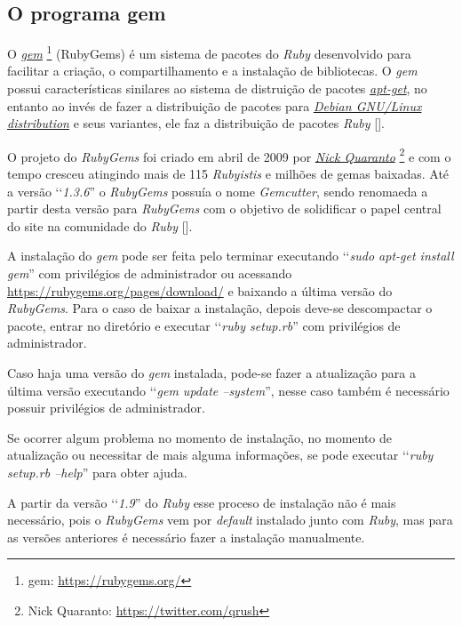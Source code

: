\subsection{O programa gem}
\label{subsection:gem}

O \emph{\href{https://rubygems.org/}{gem}} \footnote{gem: \url{https://rubygems.org/}} (RubyGems) é um sistema 
de pacotes do \emph{Ruby} desenvolvido para facilitar a criação, o compartilhamento e a instalação de 
bibliotecas. O \emph{gem} possui características sinilares ao sistema de distruição de pacotes
\emph{\href{https://packages.qa.debian.org/a/apt.html}{apt-get}}, no entanto ao invés de fazer a distribuição 
de pacotes para \emph{\href{https://www.debian.org/}{Debian GNU/Linux distribution}} e seus variantes, ele faz 
a distribuição de pacotes \emph{Ruby} [].

O projeto do \emph{RubyGems} foi criado em abril de 2009 por \emph{\href{https://twitter.com/qrush}{Nick Quaranto}}
\footnote{Nick Quaranto: \url{https://twitter.com/qrush}} e com o tempo cresceu atingindo mais de 115 
\emph{Rubyistis} e milhões de gemas baixadas. Até a versão ‘‘\emph{1.3.6}'' o \emph{RubyGems} possuía o nome 
\emph{Gemcutter}, sendo renomaeda a partir desta versão para \emph{RubyGems} com o objetivo de 
solidificar o papel central do site na comunidade do \emph{Ruby} [].

A instalação do \emph{gem} pode ser feita pelo terminar executando ‘‘\emph{sudo apt-get install gem}'' com 
privilégios de administrador ou acessando \url{https://rubygems.org/pages/download/} e baixando a última 
versão do \emph{RubyGems}. Para o caso de baixar a instalação, depois deve-se descompactar o pacote, entrar 
no diretório e executar ‘‘\emph{ruby setup.rb}'' com privilégios de administrador. 

Caso haja uma versão do \emph{gem} instalada, pode-se fazer a atualização para a última versão executando 
‘‘\emph{gem update --system}'', nesse caso também é necessário possuir privilégios de administrador. 

Se ocorrer algum problema no momento de instalação, no momento de atualização ou necessitar de mais 
alguma informações, se pode executar ‘‘\emph{ruby setup.rb --help}'' para obter ajuda.

A partir da versão ‘‘\emph{1.9}'' do \emph{Ruby} esse proceso de instalação não é mais necessário, pois o 
\emph{RubyGems} vem por \emph{default} instalado junto com \emph{Ruby}, mas para as versões anteriores 
é necessário fazer a instalação manualmente.

